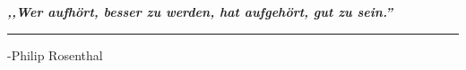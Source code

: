 \cfoot{}

\textit{\textbf{\large ,,Wer aufhört, besser zu werden, hat aufgehört, gut zu sein.''}}

\rule[-0.2cm]{1cm}{0pt} {\large -Philip Rosenthal}
